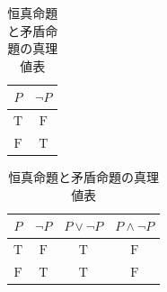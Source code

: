\begin{table}[htbp]
\centering
\small

\begin{minipage}[t]{0.45\linewidth}
\centering
\caption{否定命題の真理値表}
\label{tab:否定命題の真理値表}
\begin{tabular}{|c|c|} \hline
  $P$          & $\lnot P$    \\ \hline
  $\mathrm{T}$ & $\mathrm{F}$ \\ \hline
  $\mathrm{F}$ & $\mathrm{T}$ \\ \hline
\end{tabular}
\end{minipage}
\hfill
\begin{minipage}[t]{0.45\linewidth}
\centering
\caption{恒真命題と矛盾命題の真理値表}
\label{tab:恒真命題と矛盾命題の真理値表}
\begin{tabular}{|c|c|c|c|} \hline
  $P$          & $\lnot P$    & $P \lor \lnot P$ & $P \land \lnot P$ \\ \hline
  $\mathrm{T}$ & $\mathrm{F}$ & $\mathrm{T}$     & $\mathrm{F}$      \\ \hline
  $\mathrm{F}$ & $\mathrm{T}$ & $\mathrm{T}$     & $\mathrm{F}$      \\ \hline
\end{tabular}
\end{minipage}

\vspace{6mm}


\end{table}
